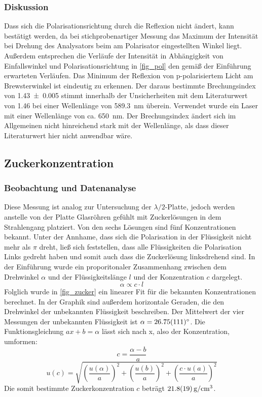 \documentclass[
	a4paper,
	12pt,
	pagesize,
	ngerman
]{scrartcl}
\begin{document}
	\subsubsection{Diskussion}
	Dass sich die Polarisationsrichtung durch die Reflexion nicht ändert, kann bestätigt werden, da bei stichprobenartiger Messung das Maximum der Intensität bei Drehung des Analysators beim am Polarisator eingestellten Winkel liegt.
	Außerdem entsprechen die Verläufe der Intensität in Abhängigkeit von Einfallswinkel und Polarisationsrichtung in \cref{fig_pol} den gemäß der Einführung erwarteten Verläufen.
	Das Minimum der Reflexion von p-polarisiertem Licht am Brewsterwinkel ist eindeutig zu erkennen.
	Der daraus bestimmte Brechungsindex von \SI{1,43 \pm 0,005}{} stimmt innerhalb der Unsicherheiten mit dem Literaturwert von \SI{1,46}{} bei einer Wellenlänge von \SI{589,3}{nm} überein. \cite{quarz_brech}
	Verwendet wurde ein Laser mit einer Wellenlänge von ca. \SI{650}{\nano \meter}.
	Der Brechungsindex ändert sich im Allgemeinen nicht hinreichend stark mit der Wellenlänge, als dass dieser Literaturwert hier nicht anwendbar wäre.

	\subsection{Zuckerkonzentration}
	\subsubsection{Beobachtung und Datenanalyse}
	Diese Messung ist analog zur Untersuchung der $\lambda/2$-Platte, jedoch werden anstelle von der Platte Glasröhren gefühlt mit Zuckerlösungen in dem Strahlengang platziert.
	Von den sechs Lösungen sind fünf Konzentrationen bekannt.
	Unter der Annhame, dass sich die Polarisation in der Flüssigkeit nicht mehr als $\pi$ dreht, ließ sich feststellen, dass alle Flüssigkeiten die Polarisation Links gedreht haben und somit auch dass die Zuckerlösung linksdrehend sind.
	In der Einführung wurde ein proporitonaler Zusammenhang zwischen dem Drehwinkel $\alpha$ und der Flüssigkeitslänge $l$ und der Konzentration $c$ dargelegt.
	\begin{equation}
		\alpha \propto c \cdot l
	\end{equation}
	Folglich wurde in \cref{fig_zucker} ein linearer Fit für die bekannten Konzentrationen berechnet.
	In der Graphik sind außerdem horizontale Geraden, die den Drehwinkel der unbekannten Flüssigkeit beschreiben.
	Der Mittelwert der vier Messungen der unbekannten Flüssigkeit ist $\alpha=\SI{26,75+-1,11}{\degree}$.
	Die Funktionsgleichung $ax+b=\alpha$ lässt sich nach x, also der Konzentration, umformen:
	\begin{equation}
		c = \frac{\alpha-b}{a}
	\end{equation}
	\begin{equation}
		u(c) = \sqrt{ \left(\frac{u(\alpha)}{a}\right)^2 + \left(\frac{u(b)}{a}\right)^2 + \left(\frac{c \cdot u(a)}{a}\right)^2}
	\end{equation}
	Die somit bestimmte Zuckerkonzentration $c$ beträgt $\SI{21,8+-1,9}{g/cm^3}$.
\end{document}
